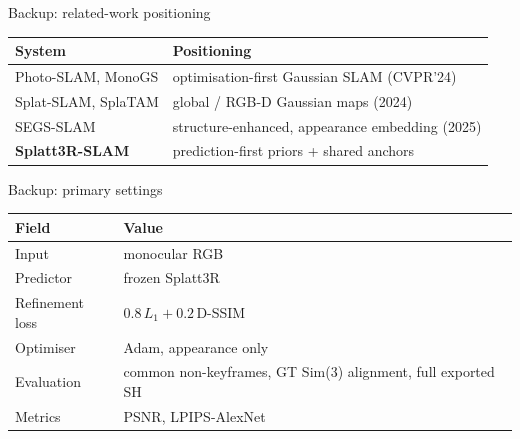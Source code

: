 \documentclass[aspectratio=169,11pt]{beamer}
\begin{document}
\appendix
\begin{frame}{Backup: related-work positioning}
  \small
  \begin{center}
  \begin{tabular}{@{}ll@{}}
    \toprule
    System & Positioning\\
    \midrule
    Photo-SLAM, MonoGS & optimisation-first Gaussian SLAM (CVPR'24)\\
    Splat-SLAM, SplaTAM & global / RGB-D Gaussian maps (2024)\\
    SEGS-SLAM & structure-enhanced, appearance embedding (2025)\\
    \textbf{Splatt3R-SLAM} & prediction-first priors + shared anchors\\
    \bottomrule
  \end{tabular}
  \end{center}
\end{frame}

\begin{frame}{Backup: primary settings}
  \small
  \begin{tabular}{@{}ll@{}}
    \toprule
    Field & Value\\
    \midrule
    Input & monocular RGB\\
    Predictor & frozen Splatt3R\\
    Refinement loss & $0.8\,L_1 + 0.2\,$D-SSIM\\
    Optimiser & Adam, appearance only\\
    Evaluation & common non-keyframes, GT Sim(3) alignment, full exported SH\\
    Metrics & PSNR, LPIPS-AlexNet\\
    \bottomrule
  \end{tabular}
\end{frame}
\end{document}
